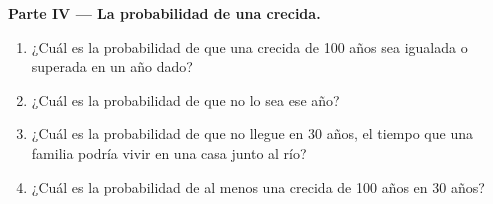 \begin{problem}
\medskip
\noindent\textbf{Parte IV --- La probabilidad de una crecida.}
\begin{enumerate}[resume]
  \item ¿Cuál es la probabilidad de que una crecida de \num{100} años sea
        igualada o superada en un año dado?
  \item ¿Cuál es la probabilidad de que no lo sea ese año?
  \item ¿Cuál es la probabilidad de que no llegue en \num{30} años, el tiempo
        que una familia podría vivir en una casa junto al río?
  \item ¿Cuál es la probabilidad de al menos una crecida de \num{100} años en
        \num{30} años?
\end{enumerate}
\end{problem}
